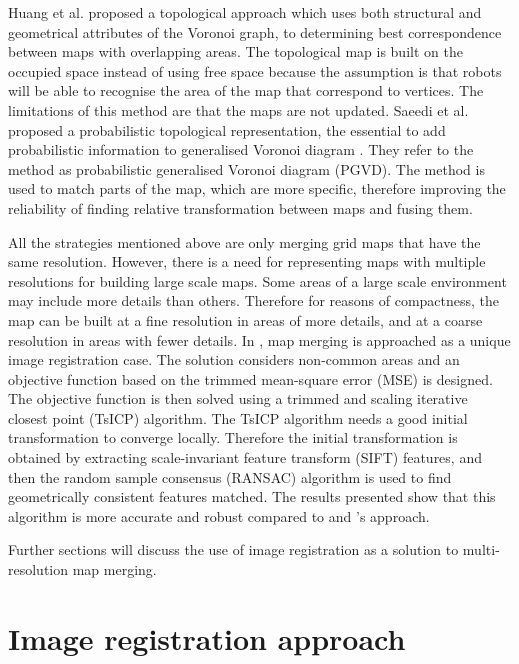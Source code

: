 Huang et al. proposed a topological approach which uses both structural and geometrical attributes of the Voronoi graph, to determining best correspondence between maps with overlapping areas\cite{Huang2005a}. The topological map is built on the occupied space instead of using free space because the assumption is that robots will be able to recognise the area of the map that correspond to vertices. The limitations of this method are that the maps are not updated. Saeedi et al. proposed a probabilistic topological representation, the essential to add probabilistic information to generalised Voronoi diagram \cite{Saeedi2012a}. They refer to the method as probabilistic generalised Voronoi diagram (PGVD). The method is used to match parts of the map, which are more specific, therefore improving the reliability of finding relative transformation between maps and fusing them.

All the strategies mentioned above are only merging grid maps that have the same resolution. However, there is a need for representing maps with multiple resolutions for building large scale maps. Some areas of a large scale environment may include more details than others. Therefore for reasons of compactness, the map can be built at a fine resolution in areas of more details, and at a coarse resolution in areas with fewer details\cite{Wurm2010OctoMapA}. In \cite{Ma2016}, map merging is approached as a unique image registration case. The solution considers non-common areas and an objective function based on the trimmed mean-square error (MSE) is designed. The objective function is then solved using a trimmed and scaling iterative closest point (TsICP) algorithm. The TsICP algorithm needs a good initial transformation to converge locally. Therefore the initial transformation is obtained by extracting scale-invariant feature transform (SIFT) features, and then the random sample consensus (RANSAC) algorithm is used to find geometrically consistent features matched. The results presented show that this algorithm is more accurate and robust compared to \cite{Blanco2013} and \cite{Carpin2008}'s approach.

Further sections will discuss the use of image registration as a solution to multi-resolution map merging.

\section{Image registration approach}

